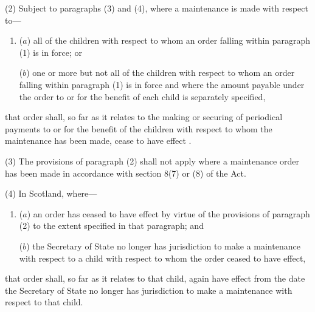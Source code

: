 \documentclass[12pt,a4paper]{article}
\begin{document}
(2) Subject to paragraphs (3) and (4), where a maintenance  is made with respect to—
\begin{enumerate}\item[]
($a$) all of the children with respect to whom an order falling within paragraph (1) is in force; or

($b$) one or more but not all of the children with respect to whom an order falling within paragraph (1) is in force and where the amount payable under the order to or for the benefit of each child is separately specified,
\end{enumerate}
that order shall, so far as it relates to the making or securing of periodical payments to or for the benefit of the children with respect to whom the maintenance  has been made, cease to have effect%
.  %

(3) The provisions of paragraph (2) shall not apply where a maintenance order has been made in accordance with section 8(7) or (8) of the Act.

(4) In Scotland, where—
\begin{enumerate}\item[]
($a$) an order has ceased to have effect by virtue of the provisions of paragraph (2) to the extent specified in that paragraph; and

($b$) 
the Secretary of State  %
no longer has jurisdiction to make a maintenance  with respect to a child with respect to whom the order ceased to have effect,
\end{enumerate}
that order shall, so far as it relates to that child, again have effect from the date 
the Secretary of State  %
no longer has jurisdiction to make a maintenance  with respect to that child.
\end{document}
